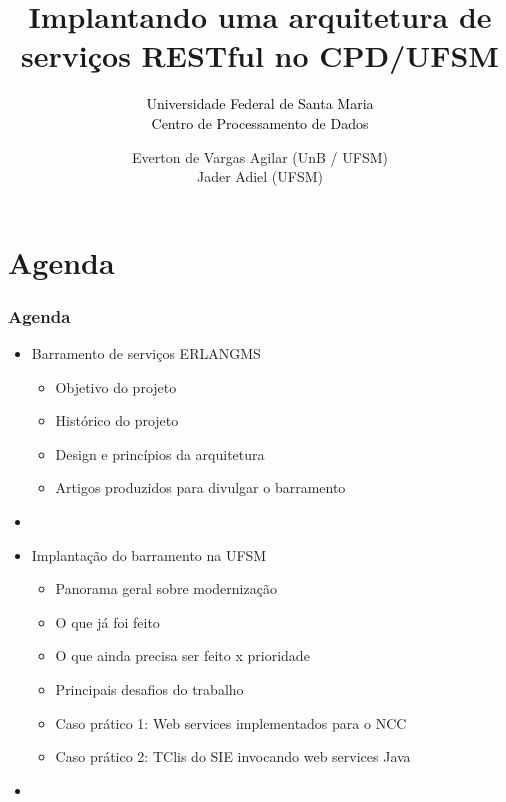 \documentclass{beamer}
\title{Implantando uma arquitetura de serviços RESTful no CPD/UFSM}
\subtitle{ \textcolor{black}{Universidade Federal de Santa Maria} \\
			\textcolor{black}{\small{Centro de Processamento de Dados}} 
}
\author{Everton de Vargas Agilar (UnB / UFSM) \\
		Jader Adiel (UFSM)
}
\begin{document}
\begin{frame}
  \titlepage
\end{frame}





\section{Agenda}


\begin{frame}
  \frametitle{Agenda}

    \begin{itemize}

	    \item<1-> Barramento de serviços ERLANGMS
		    \begin{itemize}
		  	  \item<1->Objetivo do projeto
	    	  \item<1->Histórico do projeto
  	  	 	  \item<1->Design e princípios da arquitetura
  	  	 	  \item<1->Artigos produzidos para divulgar o barramento
		    \end{itemize}
	   	  \item<1-> 

	    \item<1-> Implantação do barramento na UFSM
		    \begin{itemize}
	        \item<1->Panorama geral sobre modernização
			\item<1->O que já foi feito
			\item<1->O que ainda precisa ser feito x prioridade
			\item<1->Principais desafios do trabalho
			\item<1->Caso prático 1: Web services implementados para o NCC
			\item<1->Caso prático 2: TClis do SIE invocando web services Java
		    \end{itemize}
   	    \item<1-> 
   	    


	 \end{itemize}	   	  

\end{frame}



\end{document}
